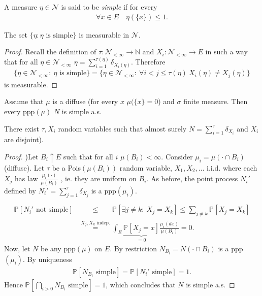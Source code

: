 \begin{defn}
	A measure $\eta \in \mathcal{N}$ is said to be \emph{simple} if for every 
	\begin{align}
		\forall x \in E \quad \eta(\{x\}) \leq 1.
	\end{align}
\end{defn}

\begin{prop}[]
	The set $\{\eta: \eta \textrm{ is simple} \}$ is measurable in $ \mathcal{N} $.
\end{prop}
\begin{proof}
	Recall the definition of $\tau:\mathcal{N}_{<\infty } \to \mathbb{N}$ and $X_i: \mathcal{N}_{< \infty } \to E$ in such a way that for all $\eta \in \mathcal{N}_{<\infty }$ $\eta = \sum_{i=1}^{\tau(\eta)} \delta_{X_i(\eta)}$. Therefore
	\begin{align}
		\{\eta \in \mathcal{N}_{< \infty } :\ \eta \textrm{ is simple}\} = \{ \eta \in \mathcal{N}_{< \infty }: \ \forall i<j \leq \tau(\eta) \ X_i(\eta) \neq X_j(\eta) \}
	\end{align}
is measurable.	
\end{proof}

\begin{theorem}[]
	Assume that $\mu $ is a diffuse (for every $x$ $\mu (\{x\}=0$) and $\sigma$ finite measure. Then every ppp$( \mu )$ $N$ is simple a.s.
\end{theorem}
\begin{rmk}[]
	There exist $\tau, X_i$ random variables such that almost surely $N= \sum_{i=1}^{\tau} \delta_{X_i}$ and $X_i$ are disjoint).
\end{rmk}
\begin{proof}
	)Let $B_i \uparrow E$ such that for all $i$ $\mu (B_i)< \infty $. Consider $\mu _i = \mu (\cdot \cap B_i)$ (diffuse). Let $\tau$ be a Pois$(\mu (B_i))$ random variable, $X_1, X_2,\ldots$ i.i.d. where each $X_j$ has law $\frac{\mu _i(\cdot)}{\mu (B_i)}$ {\color{blue}, ie. they are uniform on $B_i$}. As before, the point process $N_i'$ defined by $N_i' = \sum_{j=1}^{\tau} \delta_{X_j}$ is a ppp$(\mu _i)$. 
	\begin{align}
		\mathbb{P}_{} \left[ N_i' \textrm{ not simple} \right]  
		&\stackrel{\phantom{X_j,X_k \textrm{ indep.}}}{\leq} \mathbb{P}_{} \left[ \exists j\neq k:\ X_j = X_k \right]  \leq \sum_{j\neq k}^{} \mathbb{P}_{} \left[ X_j = X_k \right] \\ 
		&\stackrel{X_j,X_k \textrm{ indep.}}{=} \int_{E}^{} \underbrace{\mathbb{P}_{} \left[ X_j=x \right]}_{=0} \frac{\mu _i(dx)}{\mu (B_i)} = 0.
	\end{align}
	Now, let $N$ be any ppp$(\mu )$ on $E$. By restriction $N_{B_i} = N( \cdot \cap B_i)$ is a ppp$(\mu _i)$. By uniqueness 
	\begin{align}
		\mathbb{P}_{} \left[ N_{B_i} \textrm{ simple} \right]  = \mathbb{P}_{} \left[ N_i' \textrm{ simple} \right] =1.
	\end{align}
	Hence $\mathbb{P}_{} \left[ \bigcap_{i> 0} N_{B_i} \textrm{ simple} \right] =1$, which concludes that $N$ is simple a.s.	
\end{proof}

